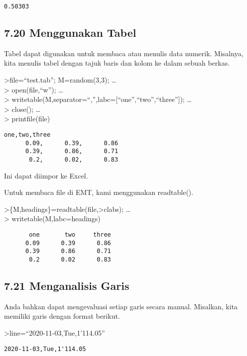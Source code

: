 \documentclass[
]{book}
\begin{document}
\begin{verbatim}
0.50303
\end{verbatim}

\subsection{7.20 Menggunakan Tabel}\label{menggunakan-tabel}

Tabel dapat digunakan untuk membaca atau menulis data numerik. Misalnya, kita menulis tabel dengan tajuk baris dan kolom ke dalam sebuah berkas.

\textgreater file=``test.tab''; M=random(3,3); \ldots{}\\
\textgreater{} open(file,``w''); \ldots{}\\
\textgreater{} writetable(M,separator=``,'',labc={[}``one'',``two'',``three''{]}); \ldots{}\\
\textgreater{} close(); \ldots{}\\
\textgreater{} printfile(file)

\begin{verbatim}
one,two,three
      0.09,      0.39,      0.86
      0.39,      0.86,      0.71
       0.2,      0.02,      0.83
\end{verbatim}

Ini dapat diimpor ke Excel.

Untuk membaca file di EMT, kami menggunakan readtable().

\textgreater\{M,headings\}=readtable(file,\textgreater clabs); \ldots{}\\
\textgreater{} writetable(M,labc=headings)

\begin{verbatim}
       one       two     three
      0.09      0.39      0.86
      0.39      0.86      0.71
       0.2      0.02      0.83
\end{verbatim}

\subsection{7.21 Menganalisis Garis}\label{menganalisis-garis}

Anda bahkan dapat mengevaluasi setiap garis secara manual. Misalkan, kita memiliki garis dengan format berikut.

\textgreater line=``2020-11-03,Tue,1'114.05''

\begin{verbatim}
2020-11-03,Tue,1'114.05
\end{verbatim}
\end{document}
